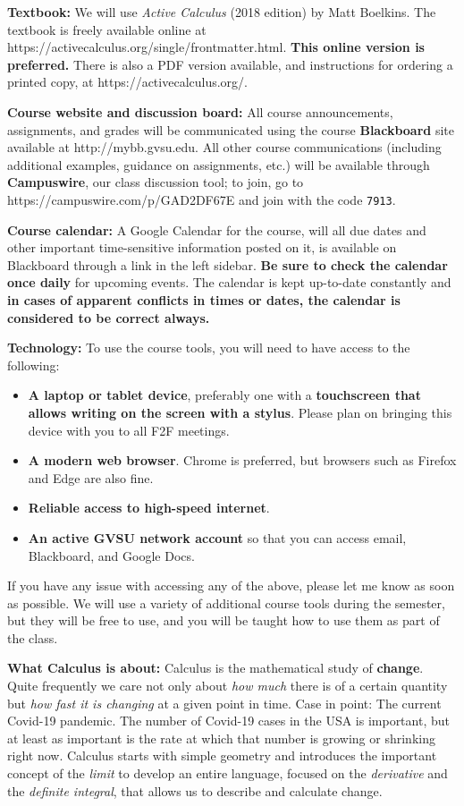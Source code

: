 \documentclass[]{article}
\providecommand{\tightlist}{%
  \setlength{\itemsep}{0pt}\setlength{\parskip}{0pt}}
\begin{document}
\textbf{Textbook:} We will use \emph{Active Calculus} (2018 edition) by
Matt Boelkins. The textbook is freely available online at
https://activecalculus.org/single/frontmatter.html. \textbf{This online
version is preferred.} There is also a PDF version available, and
instructions for ordering a printed copy, at
https://activecalculus.org/.

\textbf{Course website and discussion board:} All course announcements,
assignments, and grades will be communicated using the course
\textbf{Blackboard} site available at http://mybb.gvsu.edu. All other
course communications (including additional examples, guidance on
assignments, etc.) will be available through \textbf{Campuswire}, our
class discussion tool; to join, go to https://campuswire.com/p/GAD2DF67E
and join with the code \texttt{7913}.

\textbf{Course calendar:} A Google Calendar for the course, will all due
dates and other important time-sensitive information posted on it, is
available on Blackboard through a link in the left sidebar. \textbf{Be
sure to check the calendar once daily} for upcoming events. The calendar
is kept up-to-date constantly and \textbf{in cases of apparent conflicts
in times or dates, the calendar is considered to be correct always.}

\textbf{Technology:} To use the course tools, you will need to have
access to the following:

\begin{itemize}
\tightlist
\item
  \textbf{A laptop or tablet device}, preferably one with a
  \textbf{touchscreen that allows writing on the screen with a stylus}.
  Please plan on bringing this device with you to all F2F meetings.
\item
  \textbf{A modern web browser}. Chrome is preferred, but browsers such
  as Firefox and Edge are also fine.
\item
  \textbf{Reliable access to high-speed internet}.
\item
  \textbf{An active GVSU network account} so that you can access email,
  Blackboard, and Google Docs.
\end{itemize}

If you have any issue with accessing any of the above, please let me
know as soon as possible. We will use a variety of additional course
tools during the semester, but they will be free to use, and you will be
taught how to use them as part of the class.

\textbf{What Calculus is about:} Calculus is the mathematical study of
\textbf{change}. Quite frequently we care not only about \emph{how much}
there is of a certain quantity but \emph{how fast it is changing} at a
given point in time. Case in point: The current Covid-19 pandemic. The
number of Covid-19 cases in the USA is important, but at least as
important is the rate at which that number is growing or shrinking right
now. Calculus starts with simple geometry and introduces the important
concept of the \emph{limit} to develop an entire language, focused on
the \emph{derivative} and the \emph{definite integral}, that allows us
to describe and calculate change.
\end{document}
